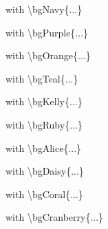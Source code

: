 \documentclass[aspectratio=169]{beamer}
\begin{document}
\begin{frame}[plain]
   with \textbackslash bgNavy\{...\}

  \vspace{2.5mm}
   with \textbackslash bgPurple\{...\}

  \vspace{2.5mm}
   with \textbackslash bgOrange\{...\}

  \vspace{2.5mm}
   with \textbackslash bgTeal\{...\}

  \vspace{2.5mm}
   with \textbackslash bgKelly\{...\}

  \vspace{2.5mm}
   with \textbackslash bgRuby\{...\}

  \vspace{2.5mm}
   with \textbackslash bgAlice\{...\}

  \vspace{2.5mm}
   with \textbackslash bgDaisy\{...\}

  \vspace{2.5mm}
   with \textbackslash bgCoral\{...\}

  \vspace{2.5mm}
   with \textbackslash bgCranberry\{...\}
\end{frame}
\end{document}
